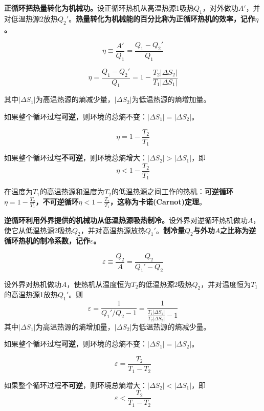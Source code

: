 \documentclass[CJK]{beamer}
\begin{document}
\begin{frame}
\bch



{\bf 正循环把热量转化为机械功。}设正循环热机从高温热源1吸热$Q_1$，对外做功$A'$，并对低温热源2放热$Q_2'$。{\bf 热量转化为机械能的百分比称为正循环热机的效率，记作$\eta$。}

$$\eta \equiv \frac{A'}{Q_1}=\frac{Q_1-Q_2'}{Q_1} $$


\ech
\end{frame}


\begin{frame}
\bch
{}
$$\eta = \frac{Q_1-Q_2'}{Q_1} = 1-\frac{T_2|\Delta S_2|}{T_1|\Delta S_1|}$$
{\small 其中$|\Delta S_1|$为高温热源的熵减少量，$|\Delta S_2|$为低温热源的熵增加量。

如果整个循环过程{\bf 可逆}，则环境的总熵不变：$|\Delta S_1| = |\Delta S_2|$。

$$ \eta = 1 - \frac{T_2}{T_1}$$

如果整个循环过程{\bf 不可逆}，则环境总熵增大：$|\Delta S_2| > |\Delta S_1|$，即
$$\eta < 1 - \frac{T_2}{T_1} $$
}
\ech
\end{frame}


\begin{frame}
\bch
{}

在温度为$T_1$的高温热源和温度为$T_2$的低温热源之间工作的热机：{\bf 可逆循环$\eta = 1 -\frac{T_2}{T_1}$，不可逆循环$\eta < 1 - \frac{T_2}{T_1}$，这称为卡诺(Carnot)定理}。
\ech
\end{frame}

\begin{frame}
\bch


{\bf 逆循环利用外界提供的机械功从低温热源吸热制冷。}设外界对逆循环热机做功$A$，使它从低温热源2吸热$Q_2$，并对高温热源放热$Q_1'$。{\bf 制冷量$Q_2$与外功$A$之比称为逆循环热机的制冷系数，记作$\varepsilon$。}

$$\varepsilon \equiv \frac{Q_2}{A}=\frac{Q_2}{Q_1'-Q_2} $$

\ech
\end{frame}


\begin{frame}
\bch
{\small
设外界对热机做功$A$，使热机从温度恒为$T_2$的低温热源2吸热$Q_2$，并对温度恒为$T_1$的高温热源1放热$Q_1'$。则
$$\varepsilon = \frac{1}{Q_1'/Q_2 - 1} = \frac{1}{\frac{T_1|\Delta S_1|}{T_2|\Delta S_2|}-1}$$
其中$|\Delta S_1|$为高温热源的熵增加量，$|\Delta S_2|$为低温热源的熵减少量。

如果整个循环过程{\bf 可逆}，则环境的总熵不变：$|\Delta S_1| = |\Delta S_2|$。

$$ \varepsilon = \frac{T_2}{T_1-T_2}$$

如果整个循环过程{\bf 不可逆}，则环境总熵增大：$|\Delta S_2| < |\Delta S_1|$，即
$$\varepsilon <  \frac{T_2}{T_1-T_2} $$
}
\ech
\end{frame}
\end{document}
